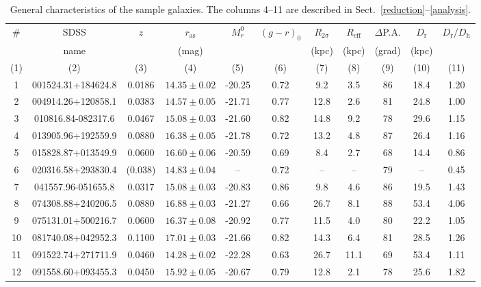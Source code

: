 \documentclass[a4paper,fleqn,usenatbib]{mnras}
\begin{document}
\begin{table}
 \centering
 \begin{minipage}{180mm}
  \centering
  \parbox[t]{150mm} {\caption{General characteristics of the sample galaxies. 
  The columns 4--11 are described in Sect.~\ref{reduction}--\ref{analysis}.}
  \label{tab1}}
  \begin{tabular}{ccccccccccc}
  \hline 
  \hline
  \# &  SDSS  & $z$ & $r_\mathrm{as}$           & $M^0_r$ & $(g - r)_0$ & $R_\mathrm{2\sigma}$ & $R_\mathrm{eff}$ & $\Delta$P.A. & $D_\mathrm{r}$ & $D_\mathrm{r}/D_\mathrm{h}$ \\ 
    &  name  &      & (mag)         &         &  & (kpc) & (kpc)             &  (grad)      & (kpc) & \\
  (1) & (2) & (3) & (4) & (5) & (6) & (7) & (8) & (9) & (10) & (11) \\
\hline 
1 & 001524.31+184624.8 & 0.0186 &  $14.35\pm0.02$ & -20.25 & 0.72 & 9.2 & 3.5 & 86 & 18.4 & 1.20\\
2 & 004914.26+120858.1 & 0.0383 &  $14.57\pm0.05$ & -21.71 & 0.77 & 12.8 & 2.6 & 81 & 24.8 & 1.00\\
3 & 010816.84-082317.6 & 0.0467 &  $15.08\pm0.03$ & -21.60 & 0.82 & 14.8 & 9.2 & 78 & 29.6 & 1.15\\
4 & 013905.96+192559.9 & 0.0880 &  $16.38\pm0.05$ & -21.78 & 0.72 & 13.2 & 4.8 & 87 & 26.4 & 1.16\\
5 & 015828.87+013549.9 & 0.0600 &  $16.60\pm0.06$ & -20.59 & 0.69 & 8.4 & 2.7 & 68 & 14.4 & 0.86\\
6 & 020316.58+293830.4 & (0.038) & $14.83\pm0.04$ & -- & 0.72 & -- & -- & 79 & -- & 0.45\\
7 & 041557.96-051655.8 & 0.0317 &  $15.08\pm0.03$ & -20.83 & 0.86 & 9.8 & 4.6 & 86 & 19.5 & 1.43\\
8 & 074308.88+240206.5 & 0.0880 &  $16.88\pm0.03$ & -21.27 & 0.66 & 26.7 & 8.1 & 88 & 53.4 & 4.06\\
9 & 075131.01+500216.7 & 0.0600 &  $16.37\pm0.08$ & -20.92 & 0.77 & 11.5 & 4.0 & 80 & 22.2 & 1.05\\
10 & 081740.08+042952.3 & 0.1100 & $17.01\pm0.03$ & -21.66 & 0.82 & 14.3 & 6.4 & 81 & 28.5 & 1.26\\
11 & 091522.74+271711.9 & 0.0460 & $14.28\pm0.02$ & -22.28 & 0.63 & 26.7 & 11.1 & 69 & 53.4 & 1.11\\
12 & 091558.60+093455.3 & 0.0450 & $15.92\pm0.05$ & -20.67 & 0.79 & 12.8 & 2.1 & 78 & 25.6 & 1.82\\

\end{tabular}
\end{minipage}
\end{table}
\end{document}
